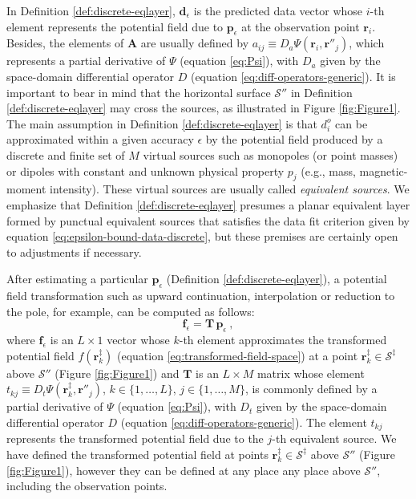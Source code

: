 \documentclass[manuscript,noblind]{geophysics}
\begin{document}
	In Definition \ref{def:discrete-eqlayer}, $\mathbf{d}_{\epsilon}$ is the predicted data vector whose 
	$i$-th element represents the potential field due to $\mathbf{p}_{\epsilon}$ at the observation point $\mathbf{r}_{i}$. 
	Besides, the elements of $\mathbf{A}$ are usually defined by 
	$a_{ij} \equiv D_{a} \Psi(\mathbf{r}_{i}, \mathbf{r}''_{j})$, which represents a 
	partial derivative of $\Psi$ (equation \ref{eq:Psi}), with $D_{a}$ given by the space-domain differential operator 
	$D$ (equation \ref{eq:diff-operators-generic}). 
	It is important to bear in mind that the horizontal surface $\mathcal{S}''$ in Definition \ref{def:discrete-eqlayer} 
	may cross the sources, as illustrated in Figure \ref{fig:Figure1}.
	The main assumption in Definition \ref{def:discrete-eqlayer} is that $d^{o}_{i}$ can be approximated 
	within a given accuracy $\epsilon$ by the potential field produced by a discrete and finite set of $M$ 
	virtual sources such as monopoles (or point masses) or dipoles with 
	constant and unknown physical property $p_{j}$ (e.g., mass, magnetic-moment intensity). 
	These virtual sources are usually called \textit{equivalent sources}.
	We emphasize that Definition \ref{def:discrete-eqlayer} presumes a planar equivalent layer formed 
	by punctual equivalent sources that satisfies the data fit criterion given by equation \ref{eq:epsilon-bound-data-discrete}, 
	but these premises are certainly open to adjustments if necessary.
	
	After estimating a particular $\mathbf{p}_{\epsilon}$ (Definition \ref{def:discrete-eqlayer}), 
	a potential field transformation such as upward continuation, 
	interpolation or reduction to the pole, for example, can be computed as follows:
	\begin{equation}
		\mathbf{f}_{\epsilon} = \mathbf{T} \, \mathbf{p}_{\epsilon} \: ,
		\label{eq:transformed-field-discrete-layer} 
	\end{equation}
	where $\mathbf{f}_{\epsilon}$ is an $L \times 1$ vector whose $k$-th element approximates 
	the transformed potential field $f(\mathbf{r}^{\ddagger}_{k})$ (equation \ref{eq:transformed-field-space}) 
	at a point $\mathbf{r}^{\ddagger}_{k} \in \mathcal{S}^{\ddagger}$ above $\mathcal{S}''$ (Figure \ref{fig:Figure1})
	and $\mathbf{T}$ is an $L \times M$ matrix whose element $t_{kj} \equiv D_{t} \Psi(\mathbf{r}^{\ddagger}_{k}, \mathbf{r}''_{j})$,
	$k \in \{ 1, \dots, L \}$, $j \in \{ 1, \dots, M \}$, 
	is commonly defined by a partial derivative of $\Psi$ (equation \ref{eq:Psi}), with $D_{t}$ given by the 
	space-domain differential operator $D$ (equation \ref{eq:diff-operators-generic}).
	The element $t_{kj}$ represents the transformed potential field due to the $j$-th equivalent source. 
	We have defined the transformed potential field at points 
	$\mathbf{r}^{\ddagger}_{k} \in \mathcal{S}^{\ddagger}$ above $\mathcal{S}''$ (Figure \ref{fig:Figure1}), however they 
	can be defined at any place any place above $\mathcal{S}''$, including the observation points. 
	
\end{document}

